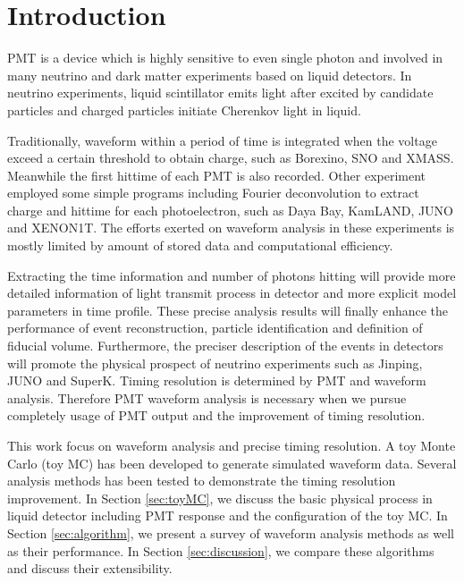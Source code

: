 \section{Introduction} %
\label{sec:introduction}

PMT is a device which is highly sensitive to even single photon and involved in many neutrino and dark matter experiments based on liquid detectors. In neutrino experiments, liquid scintillator emits light after excited by candidate particles and charged particles initiate Cherenkov light in liquid. 

Traditionally, waveform within a period of time is integrated when the voltage exceed a certain threshold to obtain charge, such as Borexino\cite{lagomarsino_gateless_1999}, SNO\cite{dunger_event_2019} and XMASS\cite{abe_xmass_2013}. Meanwhile the first hittime of each PMT is also recorded. Other experiment employed some simple programs including Fourier deconvolution to extract charge and hittime for each photoelectron, such as Daya Bay\cite{huang_flash_2018}, KamLAND\cite{the_kamland_collaboration_production_2010}, JUNO\cite{zhang_comparison_2019} and XENON1T\cite{aprile_xenon1t_2019}. The efforts exerted on waveform analysis in these experiments is mostly limited by amount of stored data and computational efficiency. 

Extracting the time information and number of photons hitting will provide more detailed information of light transmit process in detector and more explicit model parameters in time profile. These precise analysis results will finally enhance the performance of event reconstruction, particle identification and definition of fiducial volume. Furthermore, the preciser description of the events in detectors will promote the physical prospect of neutrino experiments such as Jinping\cite{beacom_physics_2017}, JUNO\cite{an_neutrino_2016} and SuperK\cite{noauthor_super-kamiokande_2003}. Timing resolution is determined by PMT and waveform analysis. Therefore PMT waveform analysis is necessary when we pursue completely usage of PMT output and the improvement of timing resolution. 

This work focus on waveform analysis and precise timing resolution. A toy Monte Carlo (toy MC) has been developed to generate simulated waveform data. Several analysis methods has been tested to demonstrate the timing resolution improvement. In Section \ref{sec:toyMC}, we discuss the basic physical process in liquid detector including PMT response and the configuration of the toy MC. In Section \ref{sec:algorithm}, we present a survey of waveform analysis methods as well as their performance. In Section \ref{sec:discussion}, we compare these algorithms and discuss their extensibility. 

